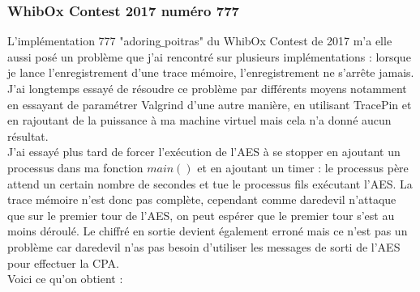 \documentclass[10pt,a4paper]{article}
\begin{document}
\subsubsection{WhibOx Contest 2017 numéro 777}
L'implémentation 777 "adoring$\_$poitras" du WhibOx Contest de 2017 m'a elle aussi posé un problème que j'ai rencontré sur plusieurs implémentations : lorsque je lance l'enregistrement d'une trace mémoire, l'enregistrement ne s'arrête jamais. J'ai longtemps essayé de résoudre ce problème par différents moyens notamment en essayant de paramétrer Valgrind d'une autre manière, en utilisant TracePin et en rajoutant de la puissance à ma machine virtuel mais cela n'a donné aucun résultat.\\
J'ai essayé plus tard de forcer l'exécution de l'AES à se stopper en ajoutant un processus dans ma fonction $main()$ et en ajoutant un timer : le processus père attend un certain nombre de secondes et tue le processus fils exécutant l'AES. La trace mémoire n'est donc pas complète, cependant comme daredevil n'attaque que sur le premier tour de l'AES, on peut espérer que le premier tour s'est au moins déroulé. Le chiffré en sortie devient également erroné mais ce n'est pas un problème car daredevil n'as pas besoin d'utiliser les messages de sorti de l'AES pour effectuer la CPA.\\
Voici ce qu'on obtient :
\end{document}
